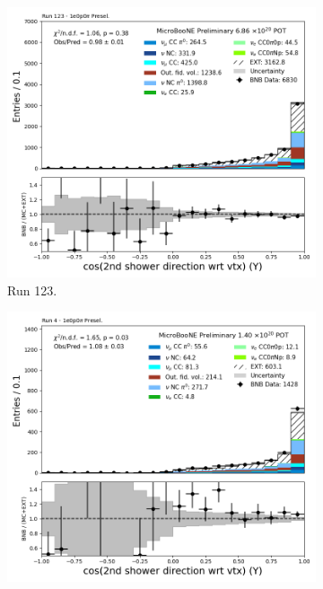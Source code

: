 \begin{figure}[H]
    \centering
    \begin{subfigure}[t]{0.32\linewidth}
        \includegraphics[width=\linewidth]{technote/Appendix_Preselection/Figures/1e0p0pi/Run123/secondshower_Y_dot_Run123_1e0p0pi_Presel.png}
        \caption{Run 123.}
    \end{subfigure}%
    \hspace{0.2cm}%
    \begin{subfigure}[t]{0.32\linewidth}
        \includegraphics[width=\linewidth]{technote/Appendix_Preselection/Figures/1e0p0pi/Run4b/secondshower_Y_dot_Run4b_1e0p0pi_Presel.png}

\end{subfigure}
\end{figure}
